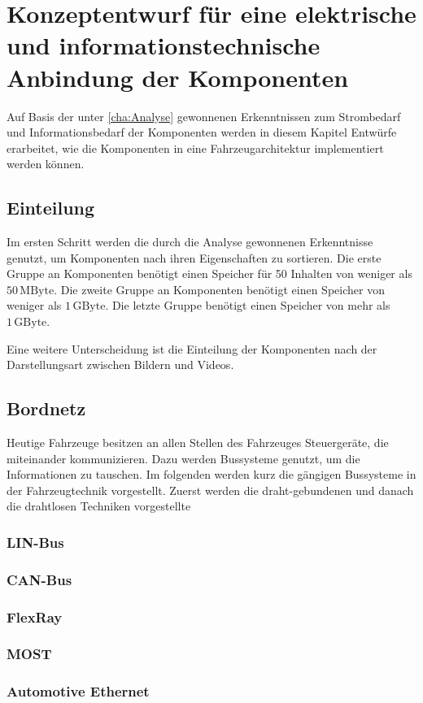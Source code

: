 \chapter{Konzeptentwurf für eine elektrische und informationstechnische Anbindung der Komponenten} \label{cha:Konzeptentwurf}
Auf Basis der unter \ref{cha:Analyse} gewonnenen Erkenntnissen zum Strombedarf und Informationsbedarf der Komponenten werden in diesem Kapitel Entwürfe erarbeitet, wie die Komponenten in eine Fahrzeugarchitektur implementiert werden können.
\section{Einteilung}
Im ersten Schritt werden die durch die Analyse gewonnenen Erkenntnisse genutzt, um Komponenten nach ihren Eigenschaften zu sortieren.
Die erste Gruppe an Komponenten benötigt einen Speicher für 50 Inhalten von weniger als $ 50\,\mathrm{MByte} $.
Die zweite Gruppe an Komponenten benötigt einen Speicher von weniger als $ 1\,\mathrm{GByte} $.
Die letzte Gruppe benötigt einen Speicher von mehr als $ 1\,\mathrm{GByte} $.

Eine weitere Unterscheidung ist die Einteilung der Komponenten nach der Darstellungsart zwischen Bildern und Videos.

\section{Bordnetz}
Heutige Fahrzeuge besitzen an allen Stellen des Fahrzeuges Steuergeräte, die miteinander kommunizieren. Dazu werden Bussysteme genutzt, um die Informationen zu tauschen.
Im folgenden werden kurz die gängigen Bussysteme in der Fahrzeugtechnik vorgestellt.
Zuerst werden die draht-gebundenen und danach die drahtlosen Techniken vorgestellte
\subsection{LIN-Bus}
\subsection{CAN-Bus}
\subsection{FlexRay}
\subsection{MOST}
\subsection{Automotive Ethernet}
